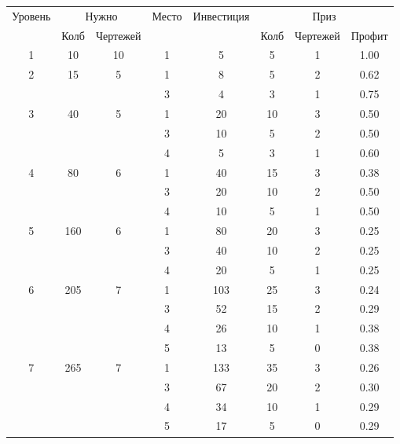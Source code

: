 \begin{longtable}[c]{|c|c|c|c|c|c|c|c|}
    \hline
    \multirow{ 2}{*}{\small Уровень} &
    \multicolumn{2}{|c|}{\small Нужно} &
    \multirow{ 2}{*}{\small Место} & 
    \multirow{ 2}{*}{\small Инвестиция} & 
    \multicolumn{3}{|c|}{\small Приз} \\\cline{2-3}\cline{6-8}
    &
    {\small Колб} & 
    {\small Чертежей} & 
    & &
    {\small Колб} & 
    {\small Чертежей} & 
    {\small Профит}
    \\\hline\endhead
    \multirow{1}{*}{1} & \multirow{1}{*}{10} & \multirow{1}{*}{10} & 1 & 5 & 5 & 1 & 1.00 \\\hline
    \multirow{2}{*}{2} & \multirow{2}{*}{15} & \multirow{2}{*}{5} & 1 & 8 & 5 & 2 & 0.62 \\\cline{4-8}
    & & & 3 & 4 & 3 & 1 & 0.75 \\\hline
    \multirow{3}{*}{3} & \multirow{3}{*}{40} & \multirow{3}{*}{5} & 1 & 20 & 10 & 3 & 0.50 \\\cline{4-8}
    & & & 3 & 10 & 5 & 2 & 0.50 \\\cline{4-8}
    & & & 4 & 5 & 3 & 1 & 0.60 \\\hline
    \multirow{3}{*}{4} & \multirow{3}{*}{80} & \multirow{3}{*}{6} & 1 & 40 & 15 & 3 & 0.38 \\\cline{4-8}
    & & & 3 & 20 & 10 & 2 & 0.50 \\\cline{4-8}
    & & & 4 & 10 & 5 & 1 & 0.50 \\\hline
    \multirow{3}{*}{5} & \multirow{3}{*}{160} & \multirow{3}{*}{6} & 1 & 80 & 20 & 3 & 0.25 \\\cline{4-8}
    & & & 3 & 40 & 10 & 2 & 0.25 \\\cline{4-8}
    & & & 4 & 20 & 5 & 1 & 0.25 \\\hline
    \multirow{4}{*}{6} & \multirow{4}{*}{205} & \multirow{4}{*}{7} & 1 & 103 & 25 & 3 & 0.24 \\\cline{4-8}
    & & & 3 & 52 & 15 & 2 & 0.29 \\\cline{4-8}
    & & & 4 & 26 & 10 & 1 & 0.38 \\\cline{4-8}
    & & & 5 & 13 & 5 & 0 & 0.38 \\\hline
    \multirow{4}{*}{7} & \multirow{4}{*}{265} & \multirow{4}{*}{7} & 1 & 133 & 35 & 3 & 0.26 \\\cline{4-8}
    & & & 3 & 67 & 20 & 2 & 0.30 \\\cline{4-8}
    & & & 4 & 34 & 10 & 1 & 0.29 \\\cline{4-8}
    & & & 5 & 17 & 5 & 0 & 0.29 \\\hline

\end{longtable}
